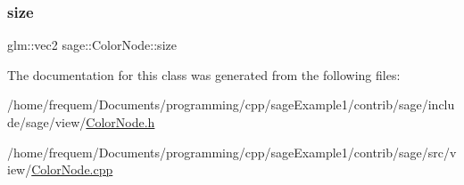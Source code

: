 \subsubsection{\texorpdfstring{size}{size}}
{\footnotesize\ttfamily glm\+::vec2 sage\+::\+Color\+Node\+::size\hspace{0.3cm}{\ttfamily [private]}}



The documentation for this class was generated from the following files\+:\begin{DoxyCompactItemize}
\item 
/home/frequem/\+Documents/programming/cpp/sage\+Example1/contrib/sage/include/sage/view/\mbox{\hyperlink{ColorNode_8h}{Color\+Node.\+h}}\item 
/home/frequem/\+Documents/programming/cpp/sage\+Example1/contrib/sage/src/view/\mbox{\hyperlink{ColorNode_8cpp}{Color\+Node.\+cpp}}\end{DoxyCompactItemize}

